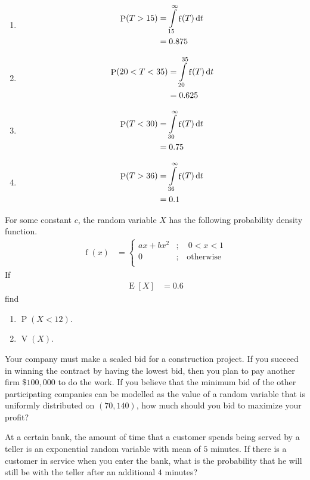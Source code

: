 \documentclass[fleqn, a4paper, 11pt, oneside]{amsart}
\theoremstyle{definition}
\theoremstyle{theorem}
\DeclareMathOperator{\prob}{\mathrm{P}}
\DeclareMathOperator{\expct}{\mathrm{E}}
\DeclareMathOperator{\var}{\mathrm{V}}
\DeclareMathOperator{\pdf}{\mathrm{f}}
\begin{document}
\begin{solution}
	\begin{enumerate}[leftmargin=*]
		\item
			\begin{align*}
				\prob(T > 15) &= \int\limits_{15}^{\infty} \pdf(T) \dif t\\
				&= 0.875
			\end{align*}
		\item
			\begin{align*}
				\prob(20 < T < 35) &= \int\limits_{20}^{35} \pdf(T) \dif t\\
				&= 0.625
			\end{align*}
		\item
			\begin{align*}
				\prob(T < 30) &= \int\limits_{30}^{\infty} \pdf(T) \dif t\\
				&= 0.75
			\end{align*}
		\item
			\begin{align*}
				\prob(T > 36) &= \int\limits_{36}^{\infty} \pdf(T) \dif t\\
				&= 0.1
			\end{align*}
	\end{enumerate}
\end{solution}

\begin{question}
	For some constant $c$, the random variable $X$ has the following probability density function.
	\begin{align*}
		\pdf(x) &=
			\begin{cases}
				a x + b x^2 &;\quad 0 < x < 1\\
				0 &;\quad \text{otherwise}\\
			\end{cases}
	\end{align*}
	If
	\begin{align*}
		\expct[X] &= 0.6
	\end{align*}
	find
	\begin{enumerate}
		\item $\prob(X < 12)$.
		\item $\var(X)$.
	\end{enumerate}
\end{question}

\begin{question}
	Your company must make a scaled bid for a construction project.
	If you succeed in winning the contract by having the lowest bid, then you plan to pay another firm $\$100,000$ to do the work.
	If you believe that the minimum bid of the other participating companies can be modelled as the value of a random variable that is uniformly distributed on $(70,140)$, how much should you bid to maximize your profit?
\end{question}

\begin{question}
	At a certain bank, the amount of time that a customer spends being served by a teller is an exponential random variable with mean of $5$ minutes.
	If there is a customer in service when you enter the bank, what is the probability that he will still be with the teller after an additional $4$ minutes?
\end{question}
\end{document}
